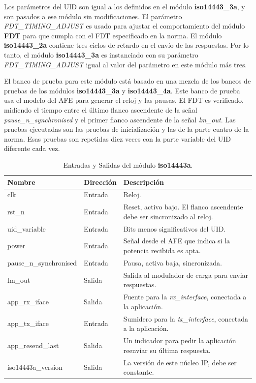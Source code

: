\documentclass[a4paper, twoside, 11pt]{report}
\begin{document}
Los parámetros del UID son igual a los definidos en el módulo \textbf{iso14443\_3a}, y son pasados a ese módulo sin modificaciones. El parámetro \textit{FDT\_TIMING\_ADJUST} es usado para ajustar el comportamiento del módulo \textbf{FDT} para que cumpla con el FDT especificado en la norma. El módulo \textbf{iso14443\_2a} contiene tres ciclos de retardo en el envío de las respuestas. Por lo tanto, el módulo \textbf{iso14443\_3a} es instanciado con su parámetro \textit{FDT\_TIMING\_ADJUST} igual al valor del parámetro en este módulo más tres.

El banco de prueba para este módulo está basado en una mezcla de los bancos de pruebas de los módulos \textbf{iso14443\_3a} y \textbf{iso14443\_4a}. Este banco de prueba usa el modelo del AFE para generar el reloj y las pausas. El FDT es verificado, midiendo el tiempo entre el último flanco ascendente de la señal \textit{pause\_n\_synchronised} y el primer flanco ascendente de la señal \textit{lm\_out}. Las pruebas ejecutadas son las pruebas de inicialización y las de la parte cuatro de la norma. Esas pruebas son repetidas diez veces con la parte variable del UID diferente cada vez.

\begin{table}[htb]
  \centering
  \tablezebra
  \begin{tabulary}{\linewidth}{l|l|L}
    \textbf{Nombre}&\textbf{Dirección}&\textbf{Descripción} \\
    \hline
    clk&Entrada&Reloj. \\
    rst\_n&Entrada&Reset, activo bajo. El flanco ascendente debe ser sincronizado al reloj. \\
    uid\_variable&Entrada&Bits menos significativos del UID. \\
    power&Entrada&Señal desde el AFE que indica si la potencia recibida es apta. \\
    pause\_n\_synchronised&Entrada&Pausa, activa baja, sincronizada. \\
    lm\_out&Salida&Salida al modulador de carga para enviar respuestas. \\
    app\_rx\_iface&Salida&Fuente para la \textit{rx\_interface}, conectada a la aplicación. \\
    app\_tx\_iface&Entrada&Sumidero para la \textit{tx\_interface}, conectada a la aplicación. \\
    app\_resend\_last&Salida&Un indicador para pedir la aplicación reenviar su última respuesta. \\
    iso14443a\_version&Salida&La versión de este núcleo IP, debe ser constante. \\
  \end{tabulary}
  \caption{Entradas y Salidas del módulo \textbf{iso14443a}.}
  \label{tab:ports_iso14443a}
\end{table}
\end{document}
